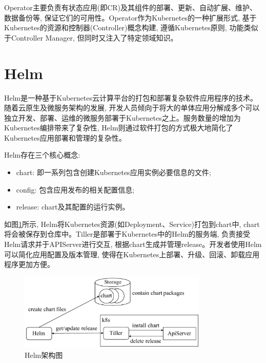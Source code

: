 Operator主要负责有状态应用(即CR)及其组件的部署、更新、自动扩展、维护、数据备份等, 保证它们的可用性。Operator作为Kubernetes的一种扩展形式, 基于Kubernetes的资源和控制器(Controller)概念构建, 遵循Kubernetes原则, 功能类似于Controller Manager, 但同时又注入了特定领域知识。


\section{Helm}\label{section: other_technologies}

Helm是一种基于Kubernetes云计算平台的打包和部署复杂软件应用程序的技术\cite{spillner2019quality}。随着云原生及微服务架构的发展, 开发人员倾向于将大的单体应用分解成多个可以独立开发、部署、运维的微服务部署于Kubernetes之上。服务数量的增加为Kubernetes编排带来了复杂性, Helm则通过软件打包的方式极大地简化了Kubernetes应用部署和管理的复杂性。

Helm存在三个核心概念:

\begin{itemize}[itemindent=2em]
    \item chart: 即一系列包含创建Kubernetes应用实例必要信息的文件;

    \item config: 包含应用发布的相关配置信息;

    \item release: chart及其配置的运行实例。
\end{itemize}

如图\ref{helm}所示, Helm将Kubernetes资源(如Deployment、Service)打包到chart中, chart将会被保存到仓库中。Tiller是部署于Kubernetes中的Helm的服务端, 负责接受Helm请求并于APIServer进行交互, 根据chart生成并管理release。开发者使用Helm可以简化应用配置及版本管理, 使得在Kubernetes上部署、升级、回滚、卸载应用程序更加方便。

\begin{figure}[h] %
    \centering %
    \includegraphics[width=0.8\textwidth]{FIGs/chapter2/helm.pdf} %
    \caption{Helm架构图} %
    \label{helm} %
\end{figure}%

